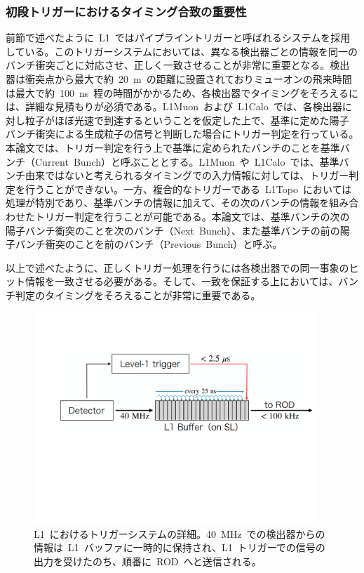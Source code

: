 \subsubsection{初段トリガーにおけるタイミング合致の重要性}
前節で述べたように~L1~ではパイプライントリガーと呼ばれるシステムを採用している。このトリガーシステムにおいては、異なる検出器ごとの情報を同一のバンチ衝突ごとに対応させ、正しく一致させることが非常に重要となる。検出器は衝突点から最大で約~20~m~の距離に設置されておりミューオンの飛来時間は最大で約~100~ns~程の時間がかかるため、各検出器でタイミングをそろえるには、詳細な見積もりが必須である。L1Muon~および~L1Calo~では、各検出器に対し粒子がほぼ光速で到達するということを仮定した上で、基準に定めた陽子バンチ衝突による生成粒子の信号と判断した場合にトリガー判定を行っている。本論文では、トリガー判定を行う上で基準に定められたバンチのことを基準バンチ（Current~Bunch）と呼ぶこととする。L1Muon~や~L1Calo~では、基準バンチ由来ではないと考えられるタイミングでの入力情報に対しては、トリガー判定を行うことができない。一方、複合的なトリガーである~L1Topo~においては処理が特別であり、基準バンチの情報に加えて、その次のバンチの情報を組み合わせたトリガー判定を行うことが可能である。本論文では、基準バンチの次の陽子バンチ衝突のことを次のバンチ（Next~Bunch）、また基準バンチの前の陽子バンチ衝突のことを前のバンチ（Previous~Bunch）と呼ぶ。

以上で述べたように、正しくトリガー処理を行うには各検出器での同一事象のヒット情報を一致させる必要がある。そして、一致を保証する上においては、バンチ判定のタイミングをそろえることが非常に重要である。

\begin{figure}[H]
        \centering   
        \includegraphics[width=0.95\textwidth,page=1]{img/pdf/pipe.pdf}
        \caption[L1~におけるトリガーシステムの詳細]{L1~におけるトリガーシステムの詳細。40~MHz~での検出器からの情報は~L1~バッファに一時的に保持され、L1~トリガーでの信号の出力を受けたのち、順番に~ROD~へと送信される。}\label{fig:pipe}
\end{figure}

